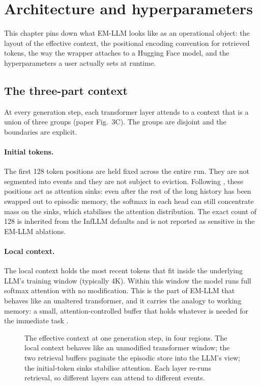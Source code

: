 \section{Architecture and hyperparameters}
\label{sec:architecture}

This chapter pins down what EM-LLM looks like as an operational object: the layout of the effective context, the positional encoding convention for retrieved tokens, the way the wrapper attaches to a Hugging Face model, and the hyperparameters a user actually sets at runtime.

\subsection{The three-part context}
\label{sec:three-part-context}

At every generation step, each transformer layer attends to a context that is a union of three groups (paper Fig.\ 3C). The groups are disjoint and the boundaries are explicit.

\paragraph{Initial tokens.}
The first 128 token positions are held fixed across the entire run. They are not segmented into events and they are not subject to eviction. Following \textcite{xiao2024attsinks}, these positions act as attention sinks: even after the rest of the long history has been swapped out to episodic memory, the softmax in each head can still concentrate mass on the sinks, which stabilises the attention distribution. The exact count of 128 is inherited from the InfLLM defaults and is not reported as sensitive in the EM-LLM ablations.

\paragraph{Local context.}
The local context holds the most recent tokens that fit inside the underlying LLM's training window (typically 4K). Within this window the model runs full softmax attention with no modification. This is the part of EM-LLM that behaves like an unaltered transformer, and it carries the analogy to working memory: a small, attention-controlled buffer that holds whatever is needed for the immediate task \cite{baddeley1992working,cowan2001focus}.

\begin{figure}[h]
\centering

\caption{The effective context at one generation step, in four regions. The local context behaves like an unmodified transformer window; the two retrieval buffers paginate the episodic store into the LLM's view; the initial-token sinks stabilise attention. Each layer re-runs retrieval, so different layers can attend to different events.}
\label{fig:context-layout}
\end{figure}

